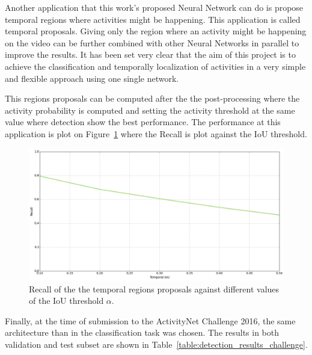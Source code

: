 Another application that this work's proposed Neural Network can do is propose temporal regions where activities might be happening. This application is called temporal proposals. Giving only the region where an activity might be happening on the video can be further combined with other Neural Networks in parallel to improve the results. It has been set very clear that the aim of this project is to achieve the classification and temporally localization of activities in a very simple and flexible approach using one single network.

This regions proposals can be computed after the the post-processing where the activity probability is computed and setting the activity threshold at the same value where detection show the best performance. The performance at this application is plot on Figure~\ref{fig:recall_vs_iou} where the Recall is plot against the IoU threshold.

\begin{figure}[H]
\begin{center}
\includegraphics[width=1\linewidth]{img/results/recall_vs_iou}
\end{center}
\caption{Recall of the the temporal regions proposals against different values of the IoU threshold $\alpha$.}
\label{fig:recall_vs_iou}
\end{figure}

Finally, at the time of submission to the ActivityNet Challenge 2016, the same architecture than in the classification task was chosen. The results in both validation and test subset are shown in Table~\ref{table:detection_results_challenge}.


